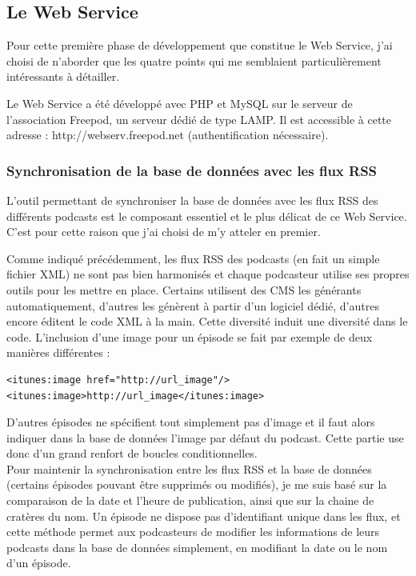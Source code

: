 \documentclass[11pt, french]{report}
\begin{document}
\subsection{Le Web Service}

Pour cette première phase de développement que constitue le Web Service, j'ai choisi de n'aborder que les quatre points qui me semblaient particulièrement intéressants à détailler.

Le Web Service a été développé avec PHP et MySQL sur le serveur de l'association Freepod, un serveur dédié de type LAMP. Il est accessible à cette adresse : http://webserv.freepod.net (authentification nécessaire).

\subsubsection{Synchronisation de la base de données avec les flux RSS}

L'outil permettant de synchroniser la base de données avec les flux RSS des différents podcasts est le composant essentiel et le plus délicat de ce Web Service. C'est pour cette raison que j'ai choisi de m'y atteler en premier.\\


Comme indiqué précédemment, les flux RSS des podcasts (en fait un simple fichier XML) ne sont pas bien harmonisés et chaque podcasteur utilise ses propres outils pour les mettre en place. Certains utilisent des CMS les générants automatiquement, d'autres les génèrent à partir d'un logiciel dédié, d'autres encore éditent le code XML à la main. Cette diversité induit une diversité dans le code. L'inclusion d'une image pour un épisode se fait par exemple de deux manières différentes :
\begin{lstlisting}
<itunes:image href="http://url_image"/>
<itunes:image>http://url_image</itunes:image>
\end{lstlisting}
D'autres épisodes ne spécifient tout simplement pas d'image et il faut alors indiquer dans la base de données l'image par défaut du podcast. Cette partie use donc d'un grand renfort de boucles conditionnelles.\\

Pour maintenir la synchronisation entre les flux RSS et la base de données (certains épisodes pouvant être supprimés ou modifiés), je me suis basé sur la comparaison de la date et l'heure de publication, ainsi que sur la chaine de cratères du nom. Un épisode ne dispose pas d'identifiant unique dans les flux, et cette méthode permet aux podcasteurs de modifier les informations de leurs podcasts dans la base de données simplement, en modifiant la date ou le nom d'un épisode.
\end{document}
